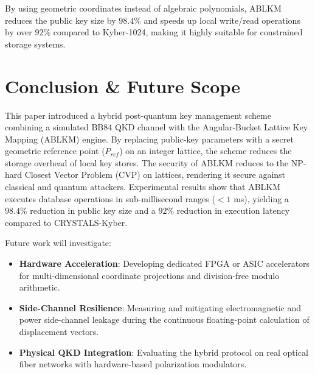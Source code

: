 \documentclass[conference,a4paper]{IEEEtran}
\begin{document}
By using geometric coordinates instead of algebraic polynomials, ABLKM reduces the public key size by $98.4\%$ and speeds up local write/read operations by over $92\%$ compared to Kyber-1024, making it highly suitable for constrained storage systems.

\section{Conclusion \& Future Scope}
This paper introduced a hybrid post-quantum key management scheme combining a simulated BB84 QKD channel with the Angular-Bucket Lattice Key Mapping (ABLKM) engine. By replacing public-key parameters with a secret geometric reference point ($P_{ref}$) on an integer lattice, the scheme reduces the storage overhead of local key stores. The security of ABLKM reduces to the NP-hard Closest Vector Problem (CVP) on lattices, rendering it secure against classical and quantum attackers. Experimental results show that ABLKM executes database operations in sub-millisecond ranges ($< 1$ ms), yielding a $98.4\%$ reduction in public key size and a $92\%$ reduction in execution latency compared to CRYSTALS-Kyber.

Future work will investigate:
\begin{itemize}
    \item \textbf{Hardware Acceleration}: Developing dedicated FPGA or ASIC accelerators for multi-dimensional coordinate projections and division-free modulo arithmetic.
    \item \textbf{Side-Channel Resilience}: Measuring and mitigating electromagnetic and power side-channel leakage during the continuous floating-point calculation of displacement vectors.
    \item \textbf{Physical QKD Integration}: Evaluating the hybrid protocol on real optical fiber networks with hardware-based polarization modulators.
\end{itemize}
\end{document}
